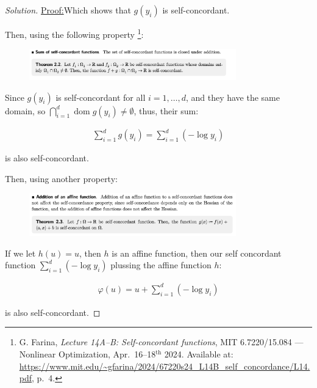 \documentclass{article}
\DeclareMathOperator{\domain}{dom}
\newenvironment{solution}
  {\renewcommand\qedsymbol{$\blacksquare$}\begin{proof}[Solution]}
  {\end{proof}}
\newenvironment{claimproof}[1]{\par\noindent\underline{Proof:}\space#1}{}
\begin{document}
\begin{solution}
\begin{claimproof}
    Which shows that $g(y_i)$ is self-concordant.
    \bigskip

    Then, using the following property
    \footnote{G. Farina, \textit{Lecture 14A–B: Self-concordant functions}, MIT 6.7220/15.084 — Nonlinear Optimization, Apr.~16--18$^{\text{th}}$ 2024. Available at: \url{https://www.mit.edu/~gfarina/2024/67220s24_L14B_self_concordance/L14.pdf}, p.~4.}:

    \begin{figure}[H]
        \centering
        \includegraphics[width = 0.8\textwidth]{sum_self_concordant.png}
    \end{figure}

    Since $g(y_i)$ is self-concordant for all $i = 1, \dots, d$,
    and they have the same domain, so $\bigcap_{i = 1}^d \domain g(y_i) \neq \emptyset$,
    thus, their sum:

    \begin{align*}
        \sum_{i = 1}^d g(y_i) = \sum_{i = 1}^d (-\log y_i)
    \end{align*}

    is also self-concordant.

    \bigskip

    Then, using another property:

    \begin{figure}[H]
        \centering
        \includegraphics[width = 0.8\textwidth]{affine_self_concordant.png}
    \end{figure}

    If we let $h(u) = u$, then $h$ is an affine function, 
    then our self concordant function $\sum_{i = 1}^d (-\log y_i)$ plussing the affine function $h$:

    \begin{align*}
        \varphi(u) = u + \sum_{i = 1}^d (-\log y_i) 
    \end{align*}

    is also self-concordant.

\end{claimproof}
\end{solution}
\end{document}
